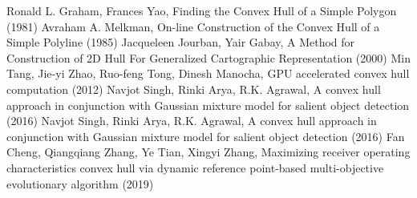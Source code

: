\begin{thebibliography}{9}
    Ronald L. Graham, Frances Yao, Finding the Convex Hull of a Simple Polygon (1981)
    Avraham A. Melkman, On-line Construction of the Convex Hull of a Simple Polyline (1985)
    Jacqueleen Jourban, Yair Gabay, A Method for Construction of 2D Hull For Generalized Cartographic Representation (2000)
    Min Tang, Jie-yi Zhao, Ruo-feng Tong, Dinesh Manocha, GPU accelerated convex hull computation (2012)
    Navjot Singh, Rinki Arya, R.K. Agrawal, A convex hull approach in conjunction with Gaussian mixture model for salient object detection (2016)
    Navjot Singh, Rinki Arya, R.K. Agrawal, A convex hull approach in conjunction with Gaussian mixture model for salient object detection (2016)
    Fan Cheng, Qiangqiang Zhang, Ye Tian, Xingyi Zhang, Maximizing receiver operating characteristics convex hull via dynamic reference point-based multi-objective evolutionary algorithm (2019)
\end{thebibliography}